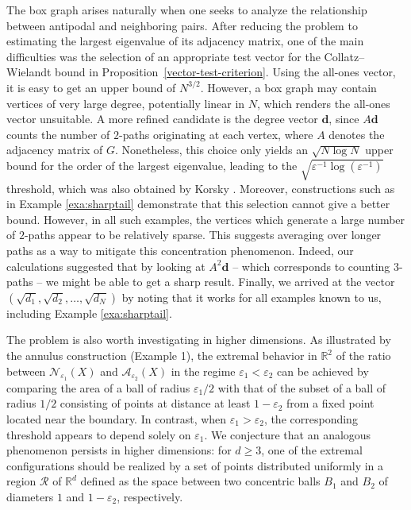 \documentclass[12pt]{article}
\newcommand{\eps}{\varepsilon}
\begin{document}
The box graph arises naturally when one seeks to analyze the relationship between antipodal and neighboring pairs. After reducing the problem to estimating the largest eigenvalue of its adjacency matrix, one of the main difficulties was the selection of an appropriate test vector for the Collatz–Wielandt bound in Proposition~\ref{vector-test-criterion}.
Using the all-ones vector, it is easy to get an upper bound of $N^{3/2}$. However, a box graph may contain vertices of very large degree, potentially linear in $N$, which renders the all-ones vector unsuitable. A more refined candidate is the degree vector $\mathbf{d}$, since $A\mathbf{d}$   counts the number of $2$-paths originating at each vertex, where $A$ denotes the adjacency matrix of $G$. Nonetheless, this choice only yields an  $\sqrt{N\log N}$ upper bound for the order of the largest eigenvalue, leading to the $\sqrt{\varepsilon^{-1}\log(\varepsilon^{-1})}$ threshold, which was also obtained by  Korsky \cite{korsky2026optimalspectralboundsantipodal}.
Moreover, constructions such as in Example \ref{exa:sharptail} demonstrate that this selection cannot give a better bound. However, in all such examples, the vertices which generate a large number of $2$-paths appear to be relatively sparse. 
This suggests averaging over longer paths as a way to mitigate this concentration phenomenon. Indeed, our calculations suggested that by looking at $A^2\mathbf{d}$ --  which corresponds to counting $3$-paths -- we might be able to get a sharp result. Finally, we arrived at the vector $(\sqrt{d_1},\sqrt{d_2},\ldots,\sqrt{d_N} )$ by noting that it works for all examples known to us, including Example \ref{exa:sharptail}. \medskip
    


The problem is also worth investigating in higher dimensions. As illustrated by the annulus construction (Example 1), the extremal behavior in $\mathbb{R}^2$ of the ratio between $\mathcal{N}_{\eps_1}(X)$ and $\mathcal{A}_{\eps_2}(X)$ in the regime $\varepsilon_1 < \varepsilon_2$ can be achieved by comparing the area of a ball of radius $\varepsilon_1/2$ with that of the subset of a ball of radius $1/2$ consisting of points at distance at least $1-\varepsilon_2$ from a fixed point located near the boundary. In contrast, when $\varepsilon_1 > \varepsilon_2$, the corresponding threshold appears to depend solely on $\varepsilon_1$. We conjecture that an analogous phenomenon persists in higher dimensions: for $d \geq 3$, one of the extremal configurations should be realized by a set of points distributed uniformly in a region $\mathcal{R}$ of $\mathbb{R}^d$ defined as the space between two concentric balls $B_1$ and $B_2$ of diameters $1$ and $1 - \varepsilon_2$, respectively. 
\end{document}
